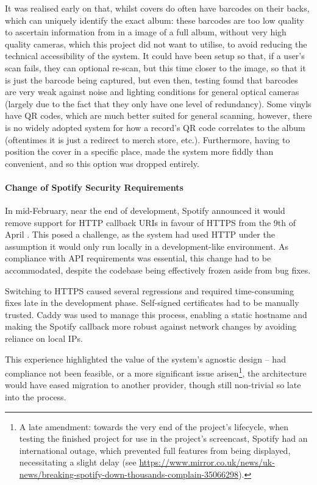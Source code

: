                 It was realised early on that, whilst covers do often have barcodes on their backs, which can uniquely identify the exact album: these barcodes are too low quality to ascertain information from in a image of a full album, without very high quality cameras, which this project did not want to utilise, to avoid reducing the technical accessibility of the system. It could have been setup so that, if a user's scan fails, they can optional re-scan, but this time closer to the image, so that it is just the barcode being captured, but even then, testing found that barcodes are very weak against noise and lighting conditions for general optical cameras (largely due to the fact that they only have one level of redundancy). Some vinyls have QR codes, which are much better suited for general scanning, however, there is no widely adopted system for how a record's QR code correlates to the album (oftentimes it is just a redirect to merch store, etc.). Furthermore, having to position the cover in a specific place, made the system more fiddly than convenient, and so this option was dropped entirely.
    
                \paragraph{Change of Spotify Security Requirements}
    
                In mid-February, near the end of development, Spotify announced it would remove support for HTTP callback URIs in favour of HTTPS from the 9th of April \cite{spotify2025security}. This posed a challenge, as the system had used HTTP under the assumption it would only run locally in a development-like environment. As compliance with API requirements was essential, this change had to be accommodated, despite the codebase being effectively frozen aside from bug fixes.
    
                Switching to HTTPS caused several regressions and required time-consuming fixes late in the development phase. Self-signed certificates had to be manually trusted. Caddy was used to manage this process, enabling a static hostname and making the Spotify callback more robust against network changes by avoiding reliance on local IPs.
    
                This experience highlighted the value of the system’s agnostic design -- had compliance not been feasible, or a more significant issue arisen\footnote{A late amendment: towards the very end of the project's lifecycle, when testing the finished project for use in the project's screencast, Spotify had an international outage, which prevented full features from being displayed, necessitating a slight delay (see \url{https://www.mirror.co.uk/news/uk-news/breaking-spotify-down-thousands-complain-35066298}).}, the architecture would have eased migration to another provider, though still non-trivial so late into the process.
    
